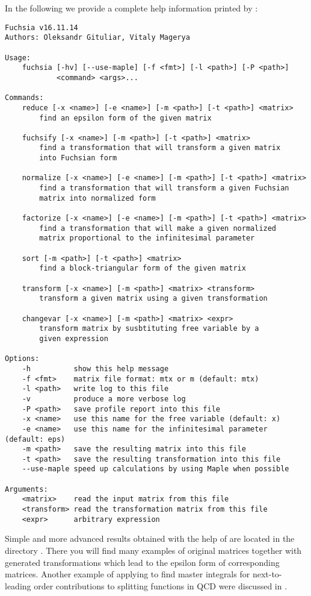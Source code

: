 \documentclass[12pt,a4paper]{article}
\begin{document}
In the following we provide a complete help information printed by :
\begin{Verbatim}
Fuchsia v16.11.14
Authors: Oleksandr Gituliar, Vitaly Magerya

Usage:
    fuchsia [-hv] [--use-maple] [-f <fmt>] [-l <path>] [-P <path>]
            <command> <args>...

Commands:
    reduce [-x <name>] [-e <name>] [-m <path>] [-t <path>] <matrix>
        find an epsilon form of the given matrix

    fuchsify [-x <name>] [-m <path>] [-t <path>] <matrix>
        find a transformation that will transform a given matrix
        into Fuchsian form

    normalize [-x <name>] [-e <name>] [-m <path>] [-t <path>] <matrix>
        find a transformation that will transform a given Fuchsian
        matrix into normalized form

    factorize [-x <name>] [-e <name>] [-m <path>] [-t <path>] <matrix>
        find a transformation that will make a given normalized
        matrix proportional to the infinitesimal parameter

    sort [-m <path>] [-t <path>] <matrix>
        find a block-triangular form of the given matrix

    transform [-x <name>] [-m <path>] <matrix> <transform>
        transform a given matrix using a given transformation

    changevar [-x <name>] [-m <path>] <matrix> <expr>
        transform matrix by susbtituting free variable by a
        given expression

Options:
    -h          show this help message
    -f <fmt>    matrix file format: mtx or m (default: mtx)
    -l <path>   write log to this file
    -v          produce a more verbose log
    -P <path>   save profile report into this file
    -x <name>   use this name for the free variable (default: x)
    -e <name>   use this name for the infinitesimal parameter (default: eps)
    -m <path>   save the resulting matrix into this file
    -t <path>   save the resulting transformation into this file
    --use-maple speed up calculations by using Maple when possible

Arguments:
    <matrix>    read the input matrix from this file
    <transform> read the transformation matrix from this file
    <expr>      arbitrary expression
\end{Verbatim}

Simple and more advanced results obtained with the help of \fuchsia are located in the directory .
There you will find many examples of original matrices together with generated transformations which lead to the epsilon form of corresponding matrices.
Another example of applying \fuchsia to find master integrals for next-to-leading order contributions to splitting functions in QCD were discussed in \cite{GM16}.
\end{document}
